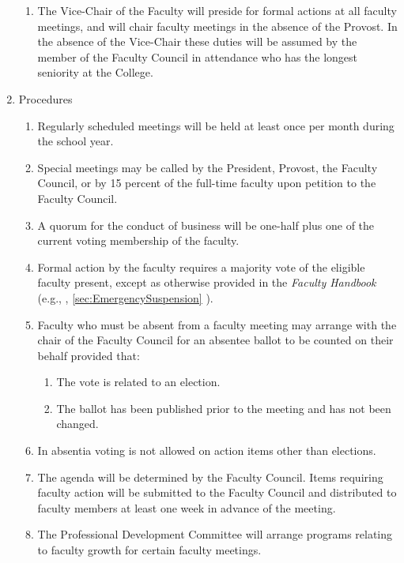 \begin{enumerate}[label=\alph*)]
{\begin{enumerate}[label=\arabic*)]
							\item{The Vice-Chair of the Faculty will preside for formal actions at all faculty meetings, and will chair faculty meetings in the absence of the Provost.  In the absence of the Vice-Chair these duties will be assumed by the member of the Faculty Council in attendance who has the longest seniority at the College.}
						\end{enumerate}
					}
					\item{Procedures
						\label{sec:FacultyMeetings-Procedures}
						\begin{enumerate}[label=\arabic*)]
							\item{Regularly scheduled meetings will be held at least once per month during the school year.}
							\item{Special meetings may be called by the President, Provost, the Faculty Council, or by 15 percent of the full-time faculty upon petition to the Faculty Council.}
							\item{A quorum for the conduct of business will be one-half plus one of the current voting membership of the faculty.}
							\item{Formal action by the faculty requires a
								majority vote of the eligible
								faculty present, except as otherwise
								provided in the \emph{Faculty
									Handbook} (e.g.,
								,
								\ref{sec:EmergencySuspension}
								).}
							\item{Faculty who must be absent from a faculty meeting may arrange with the chair of the Faculty Council for an absentee ballot to be counted on their behalf provided that:
								\begin{enumerate}[label=(\alph*)]
									\item{The vote is related to an election.}
									\item{The ballot has been published prior to the meeting and has not been changed.}
								\end{enumerate}
							}
							\item{In absentia voting is not allowed on action items other than elections.}
							\item{The agenda will be determined by the Faculty Council.  Items requiring faculty action will be submitted to the Faculty Council and distributed to faculty members at least one week in advance of the meeting.}
							\item{The Professional Development Committee will arrange programs relating to faculty growth for certain faculty meetings.}

\end{enumerate}}
\end{enumerate}
